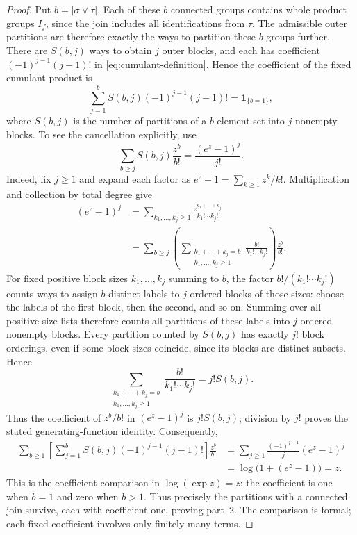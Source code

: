 \documentclass[11pt]{article}
\theoremstyle{definition}
\theoremstyle{remark}
\theoremstyle{plain}
\begin{document}
\begin{proof}
Put $b=|\sigma\vee\tau|$. Each of these $b$ connected groups
contains whole product groups $I_f$, since the join includes all
identifications from $\tau$. The admissible outer partitions are
therefore exactly the ways to partition these $b$ groups further.
There are $S(b,j)$ ways to obtain $j$ outer blocks, and each has
coefficient $(-1)^{j-1}(j-1)!$ in
\eqref{eq:cumulant-definition}. Hence the coefficient of the fixed
cumulant product is
\[
 \sum_{j=1}^b S(b,j)(-1)^{j-1}(j-1)!=\boldsymbol{1}_{\{b=1\}},
\]
where \(S(b,j)\) is the number of partitions of a $b$-element set
into \(j\) nonempty blocks. To see the cancellation explicitly, use
\[
 \sum_{b\ge j}S(b,j)\frac{z^b}{b!}
       =\frac{(e^z-1)^j}{j!}.
\]
Indeed, fix $j\ge1$ and expand each factor as
$e^z-1=\sum_{k\ge1}z^k/k!$. Multiplication and collection by
total degree give
\[
 \begin{split}
 (e^z-1)^j
 &=\sum_{k_1,\ldots,k_j\ge1}
       \frac{z^{k_1+\cdots+k_j}}{k_1!\cdots k_j!}\\
 &=\sum_{b\ge j}\left(
       \sum_{\substack{k_1+\cdots+k_j=b\\k_1,\ldots,k_j\ge1}}
       \frac{b!}{k_1!\cdots k_j!}\right)\frac{z^b}{b!}.
 \end{split}
\]
For fixed positive block sizes $k_1,\ldots,k_j$ summing to $b$,
the factor $b!/(k_1!\cdots k_j!)$ counts ways to assign $b$
distinct labels to $j$ ordered blocks of those sizes: choose the
labels of the first block, then the second, and so on.
Summing over all positive size lists therefore counts all
partitions of these labels into $j$ ordered nonempty blocks.
Every partition counted by $S(b,j)$ has exactly $j!$ block
orderings, even if some block sizes coincide, since its blocks
are distinct subsets. Hence
\[
 \sum_{\substack{k_1+\cdots+k_j=b\\k_1,\ldots,k_j\ge1}}
       \frac{b!}{k_1!\cdots k_j!}=j!S(b,j).
\]
Thus the coefficient of $z^b/b!$ in $(e^z-1)^j$ is $j!S(b,j)$;
division by $j!$ proves the stated generating-function identity.
Consequently,
\[
 \begin{split}
 \sum_{b\ge1}\left[\sum_{j=1}^b
   S(b,j)(-1)^{j-1}(j-1)!\right]\frac{z^b}{b!}
 &=\sum_{j\ge1}\frac{(-1)^{j-1}}{j}(e^z-1)^j\\
 &=\log\bigl(1+(e^z-1)\bigr)=z.
 \end{split}
\]
This is the coefficient comparison in \(\log(\exp z)=z\):
the coefficient is one when $b=1$ and zero when $b>1$.
Thus precisely the partitions with a connected join survive,
each with coefficient one, proving part~2. The comparison is
formal; each fixed coefficient involves only finitely many terms.


\end{proof}
\end{document}
